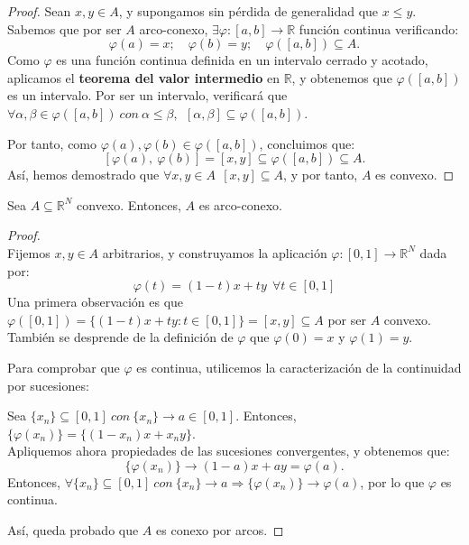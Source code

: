 \begin{proof}
Sean $x,y \in A$, y supongamos sin pérdida de generalidad que $x \le y$. Sabemos que por ser $A$ arco-conexo, $\exists \varphi : [a,b] \longrightarrow \mathbb{R}$ función continua verificando: $$\varphi(a) = x;\quad \varphi(b) = y;\quad \varphi([a,b]) \subseteq A.$$
Como $\varphi$ es una función continua definida en un intervalo cerrado y acotado, aplicamos el \textbf{teorema del valor intermedio} en $\mathbb{R}$, y obtenemos que $\varphi([a,b])$ es un intervalo. Por ser un intervalo, verificará que $\forall \alpha, \beta \in \varphi([a,b])\ con\ \alpha \le \beta,\ \ [\alpha,\beta] \subseteq \varphi([a,b])$.

Por tanto, como $\varphi(a), \varphi(b) \in \varphi([a,b])$, concluimos que: $$[\varphi(a),\ \varphi(b)] = [x,y] \subseteq \varphi([a,b]) \subseteq A.$$
Así, hemos demostrado que $\forall x,y \in A\ \ [x,y] \subseteq A$, y por tanto, $A$ es convexo.
\end{proof}



\begin{nprop}
Sea $A \subseteq \mathbb{R}^N$ convexo. Entonces, $A$ es arco-conexo.
\end{nprop}

\begin{proof} \hfill \\
Fijemos $x,y \in A$ arbitrarios, y construyamos la aplicación $\varphi: [0,1] \longrightarrow \mathbb{R}^N$ dada por: $$\varphi(t) = (1-t)x + ty\ \ \forall t\in [0,1]$$
Una primera observación es que $\varphi([0,1]) = \{(1-t)x + ty: t \in [0,1]\} = [x,y] \subseteq A$ por ser $A$ convexo. También se desprende de la definición de $\varphi$ que $\varphi(0) = x$ y $\varphi(1) = y$.

Para comprobar que $\varphi$ es continua, utilicemos la caracterización de la continuidad por sucesiones:

Sea $\{x_n\} \subseteq [0,1]\ con\ \{x_n\} \rightarrow a \in [0,1]$. Entonces, $\{\varphi(x_n) \} = \{(1- x_n)x + x_n y\}$. \\Apliquemos ahora propiedades de las sucesiones convergentes, y obtenemos que: $$\{\varphi(x_n) \} \rightarrow (1-a)x + ay = \varphi(a).$$
Entonces, $\forall \{x_n\} \subseteq [0,1]\ con\ \{x_n\} \rightarrow a \Rightarrow \{\varphi(x_n) \} \rightarrow \varphi(a)$, por lo que $\varphi$ es continua.

Así, queda probado que $A$ es conexo por arcos.
\end{proof}



